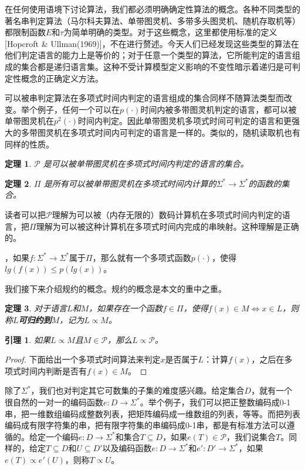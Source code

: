 \documentclass[twocolumn]{article}
\newtheorem{definition}{\hspace{2em}定理}
\newtheorem{lemma}{\hspace{2em}引理}
\theoremstyle{nonumberplain}%
\newtheorem{proof}{\hspace{2em}证明}
\begin{document}
\begin{CJK}{UTF8}{gbsn}
    在任何使用语境下讨论算法，我们都必须明确确定性算法的概念。各种不同类型的著名串判定算法（马尔科夫算法、单带图灵机、多带多头图灵机、随机存取机等）都限制函数$E$和$\tau$为简单明确的类型。对于这些概念，这里都使用标准的定义[Hopcroft \& Ullman(1969)]，不在进行赘述。今天人们已经发现这些类型的算法在他们判定语言的能力上是等价的；对于任意一个类型的算法，它所能判定的语言组成的集合都是递归语言集。这种不受计算模型定义影响的不变性暗示着递归是可判定性概念的正确定义方法。

    可以被串判定算法在多项式时间内判定的语言组成的集合同样不随算法类型而改变。举个例子，任何一个可以在$p(\cdot)$时间内被多带图灵机判定的语言，都可以被单带图灵机在$p^2(\cdot)$时间内判定。因此单带图灵机多项式时间可判定的语言和更强大的多带图灵机在多项式时间内可判定的语言是一样的。类似的，随机读取机也有同样的性质。
    \begin{definition}
        $\mathcal{P}$ 是可以被单带图灵机在多项式时间内判定的语言的集合。
    \end{definition}
    \begin{definition}
        $\Pi$ 是所有可以被单带图灵机在多项式时间内计算的$\Sigma^*\to\Sigma^*$的函数的集合。
    \end{definition}

    读者可以把$\mathcal{P}$理解为可以被（内存无限的）数码计算机在多项式时间内判定的语言，把$\Pi$理解为可以被这种计算机在多项式时间内完成的串映射。这种理解是正确的。

    {}，如果$f:\Sigma^*\to\Sigma^*$属于$\Pi$，那么就有一个多项式函数$p(\cdot)$，使得$lg(f(x))\le p(lg(x))$。

    我们接下来介绍规约的概念。规约的概念是本文的重中之重。
    \begin{definition}
        对于语言$L$和$M$，如果存在一个函数$f\in\Pi$，使得$f(x)\in M \Leftrightarrow x\in L$，则称$L${\bf 可归约到}$M$，记为$L\propto M$。
    \end{definition}

    \begin{lemma}
        如果$L\propto M$且$M \in \mathcal{P}$，那么$L\propto\mathcal{P}$。
    \end{lemma}
    \begin{proof}
        下面给出一个多项式时间算法来判定$x$是否属于$L$：计算$f(x)$，之后在多项式时间内判断是否有$f(x)\in M$。
    \end{proof}

    除了$\Sigma^*$，我们也对判定其它可数集的子集的难度感兴趣。给定集合$D$，就有一个很自然的一对一的编码函数$e:D\to\Sigma^*$。举个例子，我们可以把正整数编码成0-1串，把一维数组编码成整数列表，把矩阵编码成一维数组的列表，等等。而把列表编码成有限字符集的串，把有限字符集的串编码成0-1串，都是有标准方法可以遵循的。给定一个编码$e:D\to\Sigma^*$和集合$T\subseteq D$，如果$e(T)\in\mathcal{P}$，我们说集合$T${}。同样的，给定$T\subseteq D$和$U\subseteq D'$以及编码函数$e:D\to\Sigma^*$和$e':D'\to\Sigma^*$，如果$e(T)\propto e'(U)$，则称$T\propto U$。


\end{CJK}
\end{document}
